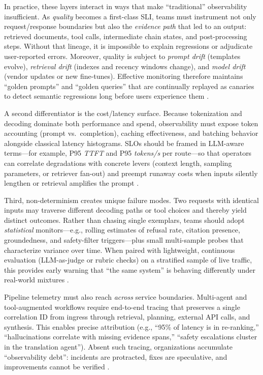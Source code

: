 In practice, these layers interact in ways that make ``traditional'' observability insufficient. As \emph{quality} becomes a first-class SLI, teams must instrument not only request/response boundaries but also the \emph{evidence path} that led to an output: retrieved documents, tool calls, intermediate chain states, and post-processing steps. Without that lineage, it is impossible to explain regressions or adjudicate user-reported errors. Moreover, quality is subject to \emph{prompt drift} (templates evolve), \emph{retrieval drift} (indexes and recency windows change), and \emph{model drift} (vendor updates or new fine-tunes). Effective monitoring therefore maintains ``golden prompts'' and ``golden queries'' that are continually replayed as canaries to detect semantic regressions long before users experience them \cite{udasi2025last9}.

A second differentiator is the cost/latency surface. Because tokenization and decoding dominate both performance and spend, observability must expose token accounting (prompt vs.\ completion), caching effectiveness, and batching behavior alongside classical latency histograms. SLOs should be framed in LLM-aware terms---for example, P95 \emph{TTFT} and P95 \emph{tokens/s} per route---so that operators can correlate degradations with concrete levers (context length, sampling parameters, or retriever fan-out) and preempt runaway costs when inputs silently lengthen or retrieval amplifies the prompt \cite{udasi2025last9}.

Third, non-determinism creates unique failure modes. Two requests with identical inputs may traverse different decoding paths or tool choices and thereby yield distinct outcomes. Rather than chasing single exemplars, teams should adopt \emph{statistical} monitors---e.g., rolling estimates of refusal rate, citation presence, groundedness, and safety-filter triggers---plus small multi-sample probes that characterize variance over time. When paired with lightweight, continuous evaluation (LLM-as-judge or rubric checks) on a stratified sample of live traffic, this provides early warning that ``the same system'' is behaving differently under real-world mixtures \cite{udasi2025last9}.

Pipeline telemetry must also reach \emph{across} service boundaries. Multi-agent and tool-augmented workflows require end-to-end tracing that preserves a single correlation ID from ingress through retrieval, planning, external API calls, and synthesis. This enables precise attribution (e.g., ``95\% of latency is in re-ranking,'' ``hallucinations correlate with missing evidence spans,'' ``safety escalations cluster in the translation agent''). Absent such tracing, organizations accumulate ``observability debt'': incidents are protracted, fixes are speculative, and improvements cannot be verified \cite{udasi2025last9}.

